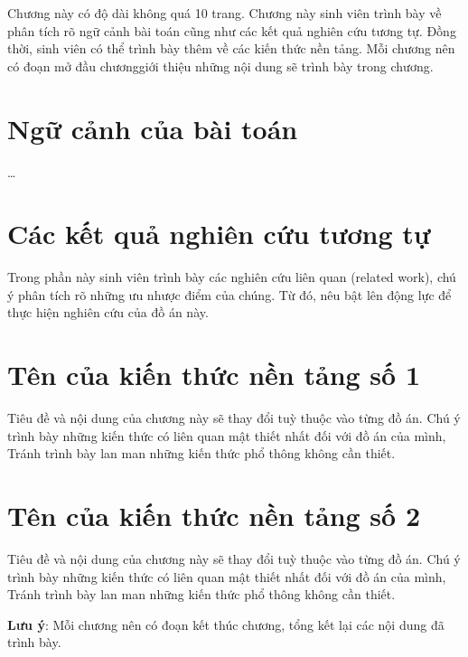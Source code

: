 \documentclass[../main.tex]{subfiles}
\begin{document}
Chương này có độ dài không quá 10 trang. Chương này sinh viên trình bày về phân tích rõ ngữ cảnh bài toán cũng như các kết quả nghiên cứu tương tự. Đồng thời, sinh viên có thể trình bày thêm về các kiến thức nền tảng. Mỗi chương nên có đoạn mở đầu chươnggiới thiệu những nội dung sẽ trình bày trong chương.

\section{Ngữ cảnh của bài toán}
\ldots

\section{Các kết quả nghiên cứu tương tự}
Trong phần này sinh viên trình bày các nghiên cứu liên quan (related work), chú ý phân tích rõ những ưu nhược điểm của chúng. Từ đó, nêu bật lên động lực để thực hiện nghiên cứu của đồ án này.


\section{Tên của kiến thức nền tảng số 1}
Tiêu đề và nội dung của chương này sẽ thay đổi tuỳ thuộc vào từng đồ án. Chú ý trình bày những kiến thức có liên quan mật thiết nhất đối với đồ án của mình, Tránh trình bày lan man những kiến thức phổ thông không cần thiết. 

\section{Tên của kiến thức nền tảng số 2}
Tiêu đề và nội dung của chương này sẽ thay đổi tuỳ thuộc vào từng đồ án. Chú ý trình bày những kiến thức có liên quan mật thiết nhất đối với đồ án của mình, Tránh trình bày lan man những kiến thức phổ thông không cần thiết.


\textbf{Lưu ý}: Mỗi chương nên có đoạn kết thúc chương,  tổng kết lại các nội dung đã trình bày.
\end{document}
